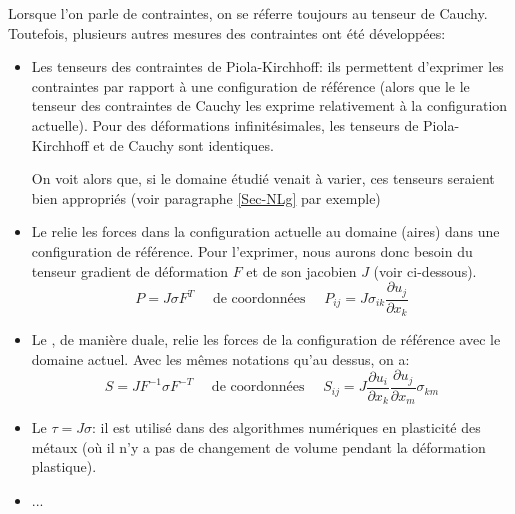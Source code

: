 \medskip
Lorsque l'on parle de contraintes, on se réferre toujours au tenseur de Cauchy.
Toutefois, plusieurs autres mesures des contraintes ont été développées:
\begin{itemize}
   \item Les tenseurs des contraintes de Piola-Kirchhoff: 
	ils permettent d'exprimer les contraintes par rapport à une configuration de référence
	(alors que le le tenseur des contraintes de Cauchy les exprime relativement à la configuration 
	actuelle).
	Pour des déformations infinitésimales, les tenseurs de Piola-Kirchhoff et de Cauchy sont
	identiques.

	On voit alors que, si le domaine étudié venait à varier, ces tenseurs seraient bien
	appropriés (voir paragraphe \ref{Sec-NLg} par exemple)

   \item Le  
	relie les forces dans la configuration actuelle au domaine (aires) dans une
	configuration de référence.
	Pour l'exprimer, nous aurons donc besoin du tenseur gradient de déformation $F$ et de son 
	jacobien $J$ (voir ci-dessous).
	\begin{equation}P=J\sigma F^T \quad \text{ de coordonnées } \quad
	P_{ij}= J \sigma_{ik}\frac{\partial u_j}{\partial x_k}\end{equation}

   \item Le , 
	de manière duale, relie les forces de la configuration de référence avec le domaine actuel.
	Avec les mêmes notations qu'au dessus, on a:
	\begin{equation} S=J F^{-1}\sigma F^{-T}  \quad \text{ de coordonnées } \quad
	S_{ij} = J \frac{\partial u_i}{\partial x_k}\frac{\partial u_j}{\partial x_m}\sigma_{km}\end{equation}

   \item Le  
	$\tau = J\sigma$: il est utilisé dans des 	algorithmes numériques en plasticité des métaux 
	(où il n'y a pas de changement de volume pendant la déformation plastique).

   \item ...
\end{itemize}

